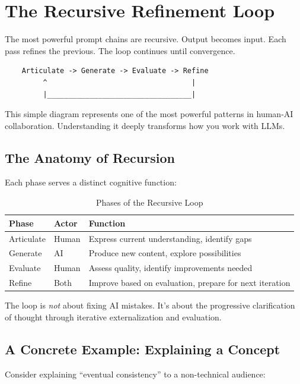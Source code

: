 \chapter{The Recursive Refinement Loop}

The most powerful prompt chains are recursive. Output becomes input. Each pass refines the previous. The loop continues until convergence.

\begin{lstlisting}
    Articulate -> Generate -> Evaluate -> Refine
         ^                                  |
         |__________________________________|
\end{lstlisting}

This simple diagram represents one of the most powerful patterns in human-AI collaboration. Understanding it deeply transforms how you work with LLMs.

\section{The Anatomy of Recursion}

Each phase serves a distinct cognitive function:

\begin{table}[H]
\centering
\begin{tabular}{llp{6cm}}
\toprule
\textbf{Phase} & \textbf{Actor} & \textbf{Function} \\
\midrule
Articulate & Human & Express current understanding, identify gaps \\
Generate & AI & Produce new content, explore possibilities \\
Evaluate & Human & Assess quality, identify improvements needed \\
Refine & Both & Improve based on evaluation, prepare for next iteration \\
\bottomrule
\end{tabular}
\caption{Phases of the Recursive Loop}
\end{table}

The loop is \emph{not} about fixing AI mistakes. It's about the progressive clarification of thought through iterative externalization and evaluation.

\section{A Concrete Example: Explaining a Concept}

Consider explaining ``eventual consistency'' to a non-technical audience:

